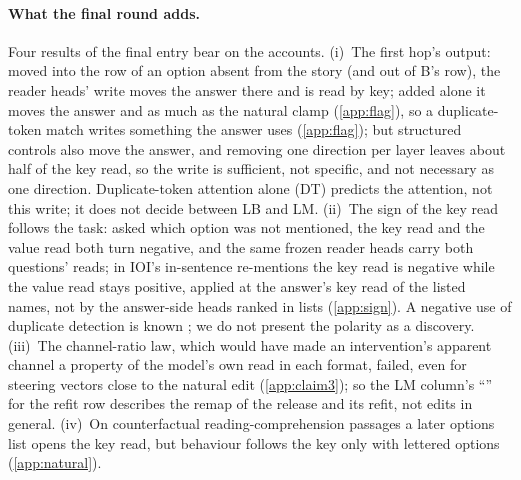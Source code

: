 \paragraph{What the final round adds.}
Four results of the final entry bear on the accounts. (i)~The first hop's output: moved into the row of an option absent from the story (and out of B's row), the reader heads' write moves the answer there and is read by key; added alone it moves the answer \JdDoseOneQwenSeven{} and \JdDoseOneMistralSeven{} as much as the natural clamp (\cref{app:flag}), so a duplicate-token match writes something the answer uses (\cref{app:flag}); but structured controls also move the answer, and removing one direction per layer leaves about half of the key read, so the write is sufficient, not specific, and not necessary as one direction. Duplicate-token attention alone (DT) predicts the attention, not this write; it does not decide between LB and LM. (ii)~The sign of the key read follows the task: asked which option was not mentioned, the key read and the value read both turn negative, and the same frozen reader heads carry both questions' reads; in IOI's in-sentence re-mentions the key read is negative while the value read stays positive, applied at the answer's key read of the listed names, not by the answer-side heads ranked in lists (\cref{app:sign}). A negative use of duplicate detection is known \citep{wang2022ioi,mcdougall2023copy}; we do not present the polarity as a discovery. (iii)~The channel-ratio law, which would have made an intervention's apparent channel a property of the model's own read in each format, failed, even for steering vectors close to the natural edit (\cref{app:claim3}); so the LM column's ``\checkmark'' for the refit row describes the remap of the release and its refit, not edits in general. (iv)~On counterfactual reading-comprehension passages a later options list opens the key read, but behaviour follows the key only with lettered options (\cref{app:natural}).

